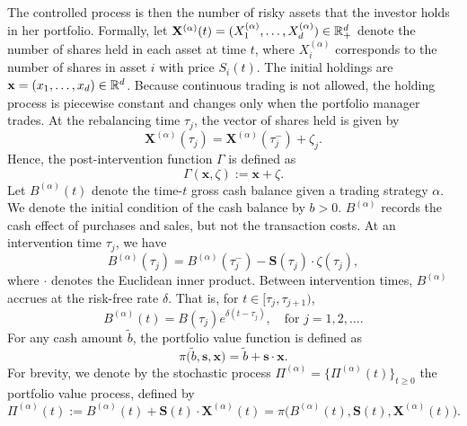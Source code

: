The controlled process is then the number of risky assets that the investor holds in her portfolio. Formally, let $\mathbf{X}^{(\alpha)}(t)=(X_1^{(\alpha)}, \ldots, X_d^{(\alpha)}) \in \mathbb{R}_+^d$ denote the number of shares held in each asset at time $t$, where $X^{(\alpha)}_i$ corresponds to the number of shares in asset $i$ with price $S_i(t)$. The initial holdings are $\mathbf x = (x_1, \ldots, x_d) \in \mathbb{R}^d$. Because continuous trading is not allowed, the holding process is piecewise constant and changes only when the portfolio manager trades. At the rebalancing time $\tau_j$, the vector of shares held is given by
\begin{equation*}
    \mathbf{X}^{(\alpha)}(\tau_j) = \mathbf{X}^{(\alpha)}(\tau_j^-) + \zeta_j. 
\end{equation*}
Hence, the post-intervention function $\Gamma$ is defined as
\begin{equation*}
    \Gamma(\mathbf{x},\zeta) := \mathbf{x} + \zeta. 
\end{equation*}
Let $B^{(\alpha)}(t)$ denote the time-$t$ gross cash balance given a trading strategy $\alpha$. We denote the initial condition of the cash balance by $b>0$. $B^{(\alpha)}$ records the cash effect of purchases and sales, but not the transaction costs. At an intervention time $\tau_j$, we have
\begin{equation*}
    B^{(\alpha)}(\tau_j) = B^{(\alpha)}(\tau_j^-) - \mathbf{S}(\tau_j) \cdot \zeta(\tau_j),
\end{equation*}
where $\cdot$ denotes the Euclidean inner product. Between intervention times, $B^{(\alpha)}$ accrues at the risk-free rate $\delta$. That is, for $t \in [\tau_j, \tau_{j+1})$,
\begin{equation*}
    B^{(\alpha)}(t) = B(\tau_j) e^{\delta(t-\tau_j)}, \quad \text{for } j = 1, 2, \ldots. 
\end{equation*}
For any cash amount $\tilde b$, the portfolio value function is defined as
\begin{equation}
    \pi \big(\tilde b, \mathbf{s}, \mathbf{x}\big) = \tilde b + \mathbf{s} \cdot \mathbf{x}. 
    \label{eqn: portfolio function}
\end{equation}
For brevity, we denote by the stochastic process $\Pi^{(\alpha)}=\{\Pi^{(\alpha)}(t)\}_{t \geq 0}$ the portfolio value process, defined by
\begin{equation}
    \Pi^{(\alpha)}(t) := B^{(\alpha)}(t) + \mathbf S(t) \cdot \mathbf X^{(\alpha)}(t) = \pi \big(B^{(\alpha)}(t), \mathbf S(t), \mathbf X^{(\alpha)}(t)\big). 
    \label{eqn: portfolio process}
\end{equation}
